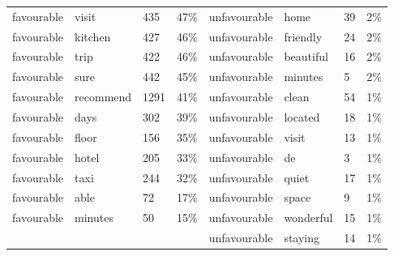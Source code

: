 \documentclass[a4paper, 12pt]{article}
\begin{document}
\begin{longtable}[l]{p{2cm}p{2cm}p{1cm}p{1.6cm}p{2.4cm}p{1.9cm}p{1cm}p{2cm}}
favourable & visit & 435 & 47\% & unfavourable & home & 39 & 2\% \\
favourable & kitchen & 427 & 46\% & unfavourable & friendly & 24 & 2\% \\
favourable & trip & 422 & 46\% & unfavourable & beautiful & 16 & 2\% \\
favourable & sure & 442 & 45\% & unfavourable & minutes & 5 & 2\% \\
favourable & recommend & 1291 & 41\% & unfavourable & clean & 54 & 1\% \\
favourable & days & 302 & 39\% & unfavourable & located & 18 & 1\% \\
favourable & floor & 156 & 35\% & unfavourable & visit & 13 & 1\% \\
favourable & hotel & 205 & 33\% & unfavourable & de & 3 & 1\% \\
favourable & taxi & 244 & 32\% & unfavourable & quiet & 17 & 1\% \\
favourable & able & 72 & 17\% & unfavourable & space & 9 & 1\% \\
favourable & minutes & 50 & 15\% & unfavourable & wonderful & 15 & 1\% \\
 &  &  &  & unfavourable & staying & 14 & 1\% \\

\end{longtable}
\normalsize



	     
                    
\end{document}
